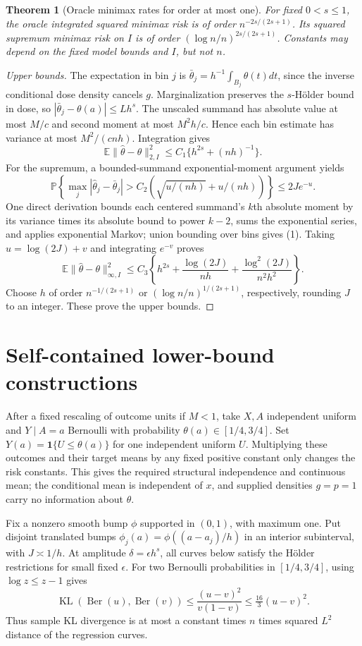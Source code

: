 \documentclass[11pt,a4paper]{article}
\newtheorem{theorem}{Theorem}[section]
\theoremstyle{remark}
\newcommand{\E}{\mathbb E}
\newcommand{\Prob}{\mathbb P}
\newcommand{\ind}{\mathbf 1}
\DeclareMathOperator{\KL}{KL}
\begin{document}
\begin{theorem}[Oracle minimax rates for order at most one]
For fixed $0<s\le1$, the oracle integrated squared minimax risk is of order $n^{-2s/(2s+1)}$. Its squared supremum minimax risk on $I$ is of order $(\log n/n)^{2s/(2s+1)}$. Constants may depend on the fixed model bounds and $I$, but not $n$.
\end{theorem}
\begin{proof}[Upper bounds]
The expectation in bin $j$ is $\bar\theta_j=h^{-1}\int_{B_j}\theta(t)dt$, since the inverse conditional dose density cancels $g$. Marginalization preserves the $s$-H\"older bound in dose, so $|\bar\theta_j-\theta(a)|\le Lh^s$. The unscaled summand has absolute value at most $M/c$ and second moment at most $M^2h/c$. Hence each bin estimate has variance at most $M^2/(cnh)$. Integration gives
\[
 \E\|\widehat\theta-\theta\|_{2,I}^2
 \le C_1\{h^{2s}+(nh)^{-1}\}.
\]
For the supremum, a bounded-summand exponential-moment argument yields
\[
 \Prob\left\{\max_j|\widehat\theta_j-\bar\theta_j|
 >C_2\left(\sqrt{u/(nh)}+u/(nh)\right)\right\}
 \le2Je^{-u}. \tag{1}
\]
One direct derivation bounds each centered summand's $k$th absolute moment by its variance times its absolute bound to power $k-2$, sums the exponential series, and applies exponential Markov; union bounding over bins gives (1). Taking $u=\log(2J)+v$ and integrating $e^{-v}$ proves
\[
 \E\|\widehat\theta-\theta\|_{\infty,I}^2
 \le C_3\left\{h^{2s}+\frac{\log(2J)}{nh}
 +\frac{\log^2(2J)}{n^2h^2}\right\}.
\]
Choose $h$ of order $n^{-1/(2s+1)}$ or $(\log n/n)^{1/(2s+1)}$, respectively, rounding $J$ to an integer. These prove the upper bounds.
\end{proof}

\section{Self-contained lower-bound constructions}
After a fixed rescaling of outcome units if $M<1$, take $X,A$ independent uniform and $Y\mid A=a$ Bernoulli with probability $\theta(a)\in[1/4,3/4]$. Set $Y(a)=\ind\{U\le\theta(a)\}$ for one independent uniform $U$. Multiplying these outcomes and their target means by any fixed positive constant only changes the risk constants. This gives the required structural independence and continuous mean; the conditional mean is independent of $x$, and supplied densities $g=p=1$ carry no information about $\theta$.

Fix a nonzero smooth bump $\phi$ supported in $(0,1)$, with maximum one. Put disjoint translated bumps $\phi_j(a)=\phi((a-a_j)/h)$ in an interior subinterval, with $J\asymp1/h$. At amplitude $\delta=\epsilon h^s$, all curves below satisfy the H\"older restrictions for small fixed $\epsilon$. For two Bernoulli probabilities in $[1/4,3/4]$, using $\log z\le z-1$ gives
\[
 \KL(\operatorname{Ber}(u),\operatorname{Ber}(v))
 \le\frac{(u-v)^2}{v(1-v)}\le\tfrac{16}{3}(u-v)^2. \tag{2}
\]
Thus sample KL divergence is at most a constant times $n$ times squared $L^2$ distance of the regression curves.
\end{document}
